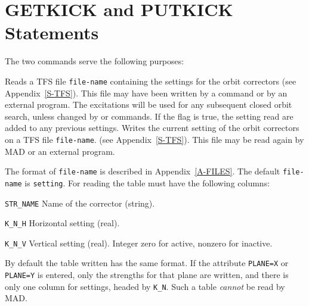 \section{GETKICK and PUTKICK Statements}
\label{S-GETKICK}
The two commands
serve the following purposes:
\begin{mylist}
Reads a TFS file {\tt file-name} containing the settings for the
orbit correctors (see Appendix~\ref{S-TFS}).
This file may have been written by a  command
or by an external program.
The excitations will be used for any subsequent closed orbit search,
unless changed by  or  commands.
If the flag  is true, the setting read are added to any
previous settings.
Writes the current setting of the orbit correctors on a TFS file
{\tt file-name}.
(see Appendix~\ref{S-TFS}).
This file may be read again by MAD or an external program.
\end{mylist}
The format of {\tt file-name} is described in Appendix~\ref{A-FILES}.
The default {\tt file-name} is {\tt setting}.
For reading the table must have the following columns:
\begin{mylist}
\item[\tt STR\_NAME]
Name of the corrector (string).
\item[\tt K\_N\_H]
Horizontal setting (real).
\item[\tt K\_N\_V]
Vertical setting (real).
Integer zero for active, nonzero for inactive.
\end{mylist}
By default the table written has the same format.
If the attribute {\tt PLANE=X} or {\tt PLANE=Y} is entered,
only the strengths for that plane are written,
and there is only one column for settings, headed by {\tt K\_N}.
Such a table {\em cannot} be read by MAD.
 
